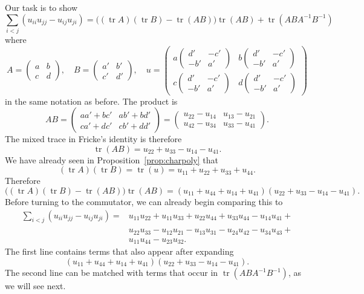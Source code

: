 \documentclass[11pt]{amsart}
\theoremstyle{definition}
\numberwithin{figure}{section}
\numberwithin{equation}{section}
\numberwithin{table}{section}
\newcommand{\tr}{\operatorname{tr}}
\begin{document}
Our task is to show
\[
\sum_{i<j} (u_{ii}u_{jj}-u_{ij}u_{ji})=\big((\tr{A})(\tr{B}) - \tr(AB) \big) \tr(AB) + \tr(ABA^{-1}B^{-1})
\]
where
\[
A = \begin{pmatrix} a & b \\ c & d \end{pmatrix}, \quad B=\begin{pmatrix} a' & b' \\ c' & d' \end{pmatrix}, 
\quad
u=\begin{pmatrix} a \begin{pmatrix} d' & -c' \\ -b' & a' \end{pmatrix} & b \begin{pmatrix} d' & -c' \\ -b' & a' \end{pmatrix} \\ c \begin{pmatrix} d' & -c' \\ -b' & a' \end{pmatrix} & d \begin{pmatrix} d' & -c' \\ -b' & a' \end{pmatrix} \end{pmatrix}
\]
in the same notation as before.
The product is
\[
AB = \begin{pmatrix} aa'+bc' & ab'+bd' \\ ca'+dc' & cb'+dd' \end{pmatrix}
=
\begin{pmatrix} u_{22}-u_{14} & u_{13}-u_{21} \\ u_{42}-u_{34} & u_{33}-u_{41} \end{pmatrix}
.
\]
The mixed trace in Fricke's identity is therefore
\[
\tr(AB)= u_{22}+u_{33}-u_{14}-u_{41}.
\]
We have already seen in Proposition~\ref{prop:charpoly} that
\[
(\tr{A})(\tr{B}) = \tr(u) = u_{11}+u_{22}+u_{33}+u_{44}.
\]
Therefore
\[
\big((\tr{A})(\tr{B}) - \tr(AB) \big) \tr(AB) = (u_{11}+u_{44}+u_{14}+u_{41})(u_{22}+u_{33}-u_{14}-u_{41})
.
\]
Before turning to the commutator, we can already begin comparing this to
\begin{align}
\sum_{i<j} (u_{ii}u_{jj}-u_{ij}u_{ji}) = &u_{11}u_{22}+u_{11}u_{33}+u_{22}u_{44}+u_{33}u_{44}-u_{14}u_{41}+ \nonumber \\
&u_{22}u_{33}-u_{12}u_{21}-u_{13}u_{31}-u_{24}u_{42}-u_{34}u_{43} + \label{ij}\\
&u_{11}u_{44}-u_{23}u_{32} . \nonumber
\end{align}
The first line contains terms that also appear after expanding
\[
 (u_{11}+u_{44}+u_{14}+u_{41})(u_{22}+u_{33}-u_{14}-u_{41}).
\]
The second line can be matched with terms that occur in $\tr(ABA^{-1}B^{-1})$, as we will see next.
\end{document}
